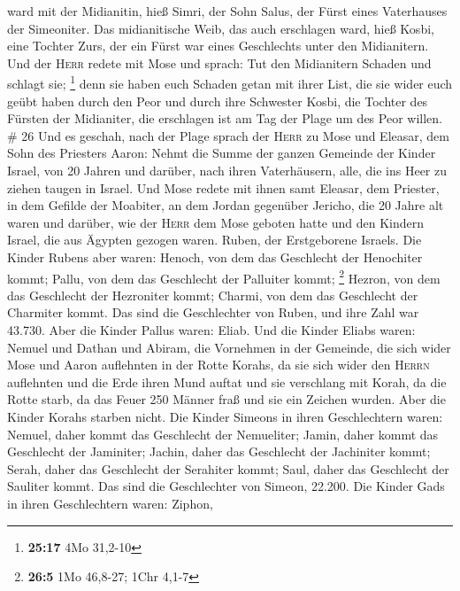 ward mit der Midianitin, hieß Simri, der Sohn Salus, der Fürst eines
Vaterhauses der Simeoniter.  Das midianitische Weib, das
auch erschlagen ward, hieß Kosbi, eine Tochter Zurs, der ein Fürst war
eines Geschlechts unter den Midianitern.  Und der
\textsc{Herr} redete mit Mose und sprach:  Tut den
Midianitern Schaden und schlagt sie; \footnote{\textbf{25:17} 4Mo
  31,2-10}  denn sie haben euch Schaden getan mit ihrer
List, die sie wider euch geübt haben durch den Peor und durch ihre
Schwester Kosbi, die Tochter des Fürsten der Midianiter, die erschlagen
ist am Tag der Plage um des Peor willen. \# 26  Und es
geschah, nach der Plage sprach der \textsc{Herr} zu Mose und Eleasar,
dem Sohn des Priesters Aaron:  Nehmt die Summe der ganzen
Gemeinde der Kinder Israel, von 20 Jahren und darüber, nach ihren
Vaterhäusern, alle, die ins Heer zu ziehen taugen in Israel.
 Und Mose redete mit ihnen samt Eleasar, dem Priester, in
dem Gefilde der Moabiter, an dem Jordan gegenüber Jericho,
 die 20 Jahre alt waren und darüber, wie der \textsc{Herr}
dem Mose geboten hatte und den Kindern Israel, die aus Ägypten gezogen
waren.  Ruben, der Erstgeborene Israels. Die Kinder Rubens
aber waren: Henoch, von dem das Geschlecht der Henochiter kommt; Pallu,
von dem das Geschlecht der Palluiter kommt; \footnote{\textbf{26:5} 1Mo
  46,8-27; 1Chr 4,1-7}  Hezron, von dem das Geschlecht der
Hezroniter kommt; Charmi, von dem das Geschlecht der Charmiter kommt.
 Das sind die Geschlechter von Ruben, und ihre Zahl war
43.730.  Aber die Kinder Pallus waren: Eliab.
 Und die Kinder Eliabs waren: Nemuel und Dathan und
Abiram, die Vornehmen in der Gemeinde, die sich wider Mose und Aaron
auflehnten in der Rotte Korahs, da sie sich wider den \textsc{Herrn}
auflehnten  und die Erde ihren Mund auftat und sie
verschlang mit Korah, da die Rotte starb, da das Feuer 250 Männer fraß
und sie ein Zeichen wurden.  Aber die Kinder Korahs
starben nicht.  Die Kinder Simeons in ihren Geschlechtern
waren: Nemuel, daher kommt das Geschlecht der Nemueliter; Jamin, daher
kommt das Geschlecht der Jaminiter; Jachin, daher das Geschlecht der
Jachiniter kommt;  Serah, daher das Geschlecht der
Serahiter kommt; Saul, daher das Geschlecht der Sauliter kommt.
 Das sind die Geschlechter von Simeon, 22.200.
 Die Kinder Gads in ihren Geschlechtern waren: Ziphon,
